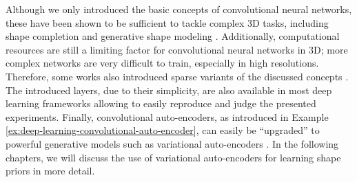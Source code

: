 Although we only introduced the basic concepts of convolutional neural networks,
these have been shown to be sufficient to tackle complex 3D tasks, including
shape completion \cite{FirmanBrostow:2016,SmithMeger:2017,DaiNiessner:2016,
SharmaFritz:2016,RezendeHeess:2016,FanSuGuibas:2016} and generative
shape modeling \cite{SmithMeger:2017,GirdharGupta:2016,
BrockWeston:2016,WuSongXiao:2015,WuTenenbaum:2016}. Additionally,
computational resources are still a limiting factor for convolutional
neural networks in 3D; more complex networks are very difficult to train,
especially in high resolutions. Therefore, some works
also introduced sparse variants of the discussed concepts \cite{WangTong:2017,
RieglerGeiger:2016,RieglerGeiger:2017,TatarchenkoBrox:2017,LiGuibas:2016,
EngelckePosner:2017,Graham:2015}. The introduced layers, due to their
simplicity, are also available in most deep learning frameworks allowing to
easily reproduce and judge the presented experiments. Finally, convolutional
auto-encoders, as introduced in Example \ref{ex:deep-learning-convolutional-auto-encoder},
can easily be ``upgraded'' to powerful generative models such as variational
auto-encoders \cite{KingmaWelling:2013,ImAhnMemisevicBengio:2017,
JangGuPoole:2016,MaddisonMnihTeh:2016}. In the following chapters, we will
discuss the use of variational auto-encoders for learning shape priors in more detail.
